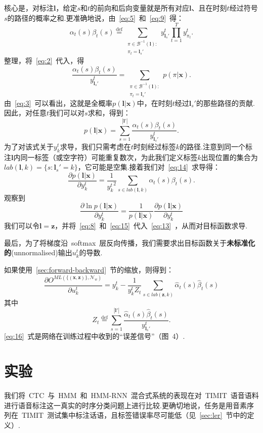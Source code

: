 \documentclass{ctexart}
\def\cB{\mathcal{B}}
\def\cN{\mathcal{N}}
\def\vl{\mathbf{l}}
\def\vx{\mathbf{x}}
\def\vz{\mathbf{z}}
\def\defeq{\overset{\mathrm{def}}{=}}
\begin{document}
核心是，对标注$\vl$，给定$s$和$t$的前向和后向变量就是所有对应$\vl$、且在时刻$t$经过符号$s$的路径的概率之和.更准确地说，由~\eqref{eq:5}~和~\eqref{eq:9}~得：
\[
	\alpha_t(s)\beta_t(s)
	\defeq
	\sum_{
		\substack{
			\pi\in\cB^{-1}(\vl):\\
			\pi_t = \vl_s'
		}
	}
	y_{\vl_s'}^t
	\prod_{t=1}^T y_{\pi_t}^t.
\]
整理，将~\eqref{eq:2}~代入，得
\[\frac{\alpha_t(s)\beta_t(s)}{y_{\vl_s'}^t} = 
	\sum_{
		\substack{
			\pi\in\cB^{-1}(\vl):\\
			\pi_t = \vl_s'
		}
	}
	p(\pi|\vx).
\]
由~\eqref{eq:3}~可以看出，这就是全概率$p(\vl|\vx)$中，在时刻$t$经过$\vl_s'$的那些路径的贡献.因此，对任意$t$我们可以对$s$求和，得到：
\begin{equation}
	\label{eq:14}
	p(\vl|\vx) = \sum_{s=1}^{|\vl'|}\frac{\alpha_t(s)\beta_t(s)}{y_{\vl_s'}^t}.
\end{equation}
为了对该式关于$y_k^t$求导，我们只需考虑在$t$时刻经过标签$k$的路径.注意到同一个标注$\vl$内同一标签（或空字符）可能重复数次，为此我们定义标签$k$出现位置的集合为$\textit{lab}(\vl, k) = \{s : \vl_s' = k\}$，它可能是空集.接着我们对~\ref{eq:14}~求导得：
\begin{equation}
	\label{eq:15}
	\frac{\partial p(\vl|\vx)}{\partial y_k^t} = 
	\frac{1}{{y_k^t}^2}
	\sum_{s\in\textit{lab}(\vl, k)} \alpha_t(s)\beta_t(s).
\end{equation}
观察到
\[\frac{\partial\ln{p(\vl|\vx)}}{\partial y_k^t} = \frac{1}{p(\vl|\vx)}\frac{\partial p(\vl|\vx)}{\partial y_k^t}\]
我们可以令$\vl = \vz$，并将~\eqref{eq:8}~和~\eqref{eq:15}~代入~\eqref{eq:13}~，从而对目标函数求导.

最后，为了将梯度沿~softmax~层反向传播，我们需要求出目标函数关于\textbf{未标准化的}(unnormalised)输出$u_k^t$的导数.

如果使用~\ref{sec:forward-backward}~节的缩放，则得到：
\begin{equation}
	\label{eq:16}
	\frac{\partial O^{\textit{ML}(\{(\vx,\vz)\},\cN_w)}}{\partial u_k^t} = 
	y_k^t - \frac{1}{y_k^tZ_t}\sum_{s\in\textit{lab}(\vz,k)}\hat{\alpha}_t(s)\hat{\beta}_t(s)
\end{equation}
其中
\[Z_t \defeq \sum_{s=1}^{|\vl'|}\frac{\hat{\alpha}_t(s)\hat{\beta}_t(s)}{y_{\vl_s'}^t}.\]
\eqref{eq:16}~式是网络在训练过程中收到的“误差信号”（图~4）.
\section{实验}
\label{sec:experiments}
我们将~CTC~与~HMM~和~HMM-RNN~混合式系统的表现在对~TIMIT~语音语料进行语音标注这一真实的时序分类问题上进行比较.更确切地说，任务是用音素序列在~TIMIT~测试集中标注话语，且标签错误率尽可能低（见~\ref{sec:ler}~节中的定义）.
\end{document}
